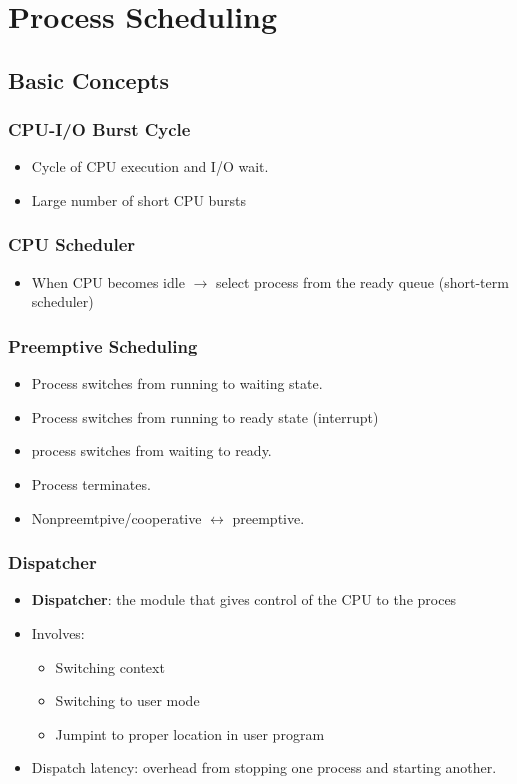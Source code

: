 \documentclass[10pt]{report}
\begin{document}
\chapter{Process Scheduling} \label{ch:Chapter5}
	\section{Basic Concepts}
		\subsection{CPU-I/O Burst Cycle}
			\begin{itemize}
				\item Cycle of CPU execution and I/O wait.
				\item Large number of short CPU bursts
			\end{itemize}

		\subsection{CPU Scheduler}
			\begin{itemize}
				\item When CPU becomes idle $\rightarrow$ select process from the ready queue (short-term scheduler)
			\end{itemize}

		\subsection{Preemptive Scheduling}
			\begin{itemize}
				\item Process switches from running to waiting state.
				\item Process switches from running to ready state (interrupt)
				\item process switches from waiting to ready.
				\item Process terminates.
				\item Nonpreemtpive/cooperative $\leftrightarrow$ preemptive.
			\end{itemize}

		\subsection{Dispatcher}
			\begin{itemize}
				\item \textbf{Dispatcher}: the module that gives control of the CPU to the proces
				\item Involves:
				\begin{itemize}
					\item Switching context
					\item Switching to user mode
					\item Jumpint to proper location in user program
				\end{itemize}
				\item Dispatch latency: overhead from stopping one process and starting another.
			\end{itemize}
\end{document}

